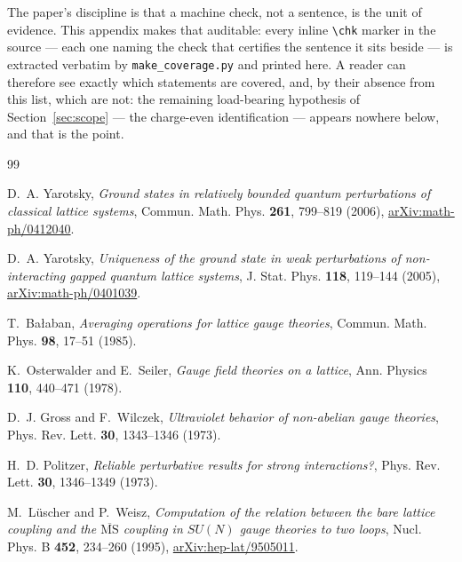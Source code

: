 \documentclass[11pt]{article}
\theoremstyle{plain}
\theoremstyle{definition}
\theoremstyle{remark}
\begin{document}
The paper's discipline is that a machine check, not a sentence, is the unit
of evidence. This appendix makes that auditable: every inline
\texttt{\textbackslash chk} marker in the source --- each one naming the
check that certifies the sentence it sits beside --- is extracted verbatim
by \texttt{make\_coverage.py} and printed here. A reader can therefore see
exactly which statements are covered, and, by their absence from this list,
which are not: the remaining load-bearing hypothesis of
Section~\ref{sec:scope} --- the charge-even identification --- appears
nowhere below, and that is the point.



\begin{thebibliography}{99}\small\sloppy\raggedright

 D.~A. Yarotsky,
  \emph{Ground states in relatively bounded quantum perturbations of classical
  lattice systems}, Commun. Math. Phys. \textbf{261}, 799--819 (2006),
  \href{https://arxiv.org/abs/math-ph/0412040}{arXiv:math-ph/0412040}.

 D.~A. Yarotsky,
  \emph{Uniqueness of the ground state in weak perturbations of
  non-interacting gapped quantum lattice systems}, J. Stat. Phys.
  \textbf{118}, 119--144 (2005),
  \href{https://arxiv.org/abs/math-ph/0401039}{arXiv:math-ph/0401039}.

 T.~Ba{\l}aban,
  \emph{Averaging operations for lattice gauge theories},
  Commun. Math. Phys. \textbf{98}, 17--51 (1985).

 K.~Osterwalder and E.~Seiler,
  \emph{Gauge field theories on a lattice},
  Ann. Physics \textbf{110}, 440--471 (1978).

 D.~J. Gross and F.~Wilczek,
  \emph{Ultraviolet behavior of non-abelian gauge theories},
  Phys. Rev. Lett. \textbf{30}, 1343--1346 (1973).

 H.~D. Politzer,
  \emph{Reliable perturbative results for strong interactions?},
  Phys. Rev. Lett. \textbf{30}, 1346--1349 (1973).

 M.~L\"uscher and P.~Weisz,
  \emph{Computation of the relation between the bare lattice coupling and the
  $\overline{\mathrm{MS}}$ coupling in $SU(N)$ gauge theories to two loops},
  Nucl. Phys. B \textbf{452}, 234--260 (1995),
  \href{https://arxiv.org/abs/hep-lat/9505011}{arXiv:hep-lat/9505011}.


\end{thebibliography}
\end{document}
